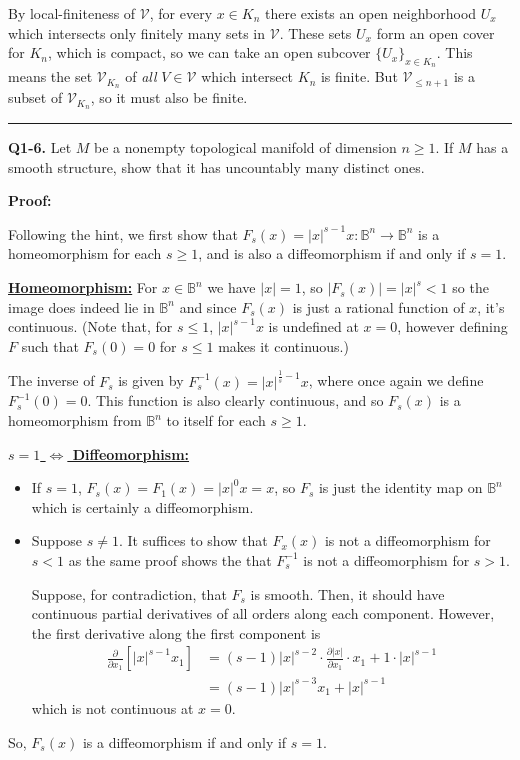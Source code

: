\documentclass{article}
\begin{document}
By local-finiteness of $\mathcal{V}$, for every $x \in K_n$ there exists an open neighborhood $U_x$ which intersects only finitely many sets in $\mathcal{V}$. These sets $U_x$ form an open cover for $K_n$, which is compact, so we can take an open subcover $\{U_x\}_{x \in K_n}$. This means the set $\mathcal{V}_{K_n}$ of \emph{all} $V \in \mathcal{V}$ which intersect $K_n$ is finite. But $\mathcal{V}_{\leq n + 1}$ is a subset of $\mathcal{V}_{K_n}$, so it must also be finite.
\vskip 0.5cm
\hrule 
\vskip 0.5cm

\textbf{Q1-6.} Let $M$ be a nonempty topological manifold of dimension $n \geq 1$. If $M$ has a smooth structure, show that it has uncountably many distinct ones.

\vskip 0.5cm
\textbf{Proof:}

Following the hint, we first show that $F_s(x) = |x|^{s-1} x : \mathbb{B}^n \rightarrow \mathbb{B}^n$ is a homeomorphism for each $s \geq 1$, and is also a diffeomorphism if and only if $s = 1$.

\vskip 0.25cm
\underline{\textbf{Homeomorphism:}} For $x \in \mathbb{B}^{n}$ we have $|x| = 1$, so $|F_s(x)| = |x|^s < 1$ so the image does indeed lie in $\mathbb{B}^n$ and since $F_s(x)$ is just a rational function of $x$, it's continuous. (Note that, for $s \leq 1$, $|x|^{s-1}x$ is undefined at $x = 0$, however defining $F$ such that $F_s(0) = 0$ for $s \leq 1$ makes it continuous.)

\vskip 0.25cm
The inverse of $F_s$ is given by $F_s^{-1}(x) = |x|^{\frac{1}{s} - 1} x$, where once again we define $F_s^{-1}(0) = 0$. This function is also clearly continuous, and so $F_s(x)$ is a homeomorphism from $\mathbb{B}^n$ to itself for each $s \geq 1$.

\vskip 0.5cm
\underline{\textbf{$s = 1$ $\iff$ Diffeomorphism:} }
\begin{itemize}
  \item If $s = 1$, $F_s(x) = F_1(x) = |x|^0 x = x$, so $F_s$ is just the identity map on $\mathbb{B}^n$ which is certainly a diffeomorphism.
  \item Suppose $s \neq 1$. It suffices to show that $F_x(x)$ is not a diffeomorphism for $s < 1$ as the same proof shows the that $F_s^{-1}$ is not a diffeomorphism for $s > 1$. 
  
  \vskip 0.5cm
  Suppose, for contradiction, that $F_s$ is smooth. Then, it should have continuous partial derivatives of all orders along each component. However, the first derivative along the first component is
  \begin{align*}
    \frac{\partial}{\partial x_1} \left[ |x|^{s-1} x_1 \right]
    &= (s-1)|x|^{s-2} \cdot \frac{\partial|x|}{\partial x_1} \cdot x_1 + 1 \cdot |x|^{s-1} \\
    &= (s-1)|x|^{s-3} x_1 + |x|^{s-1}
  \end{align*}
  which is not continuous at $x = 0$.
\end{itemize}
So, $F_s(x)$ is a diffeomorphism if and only if $s = 1$.
\end{document}
